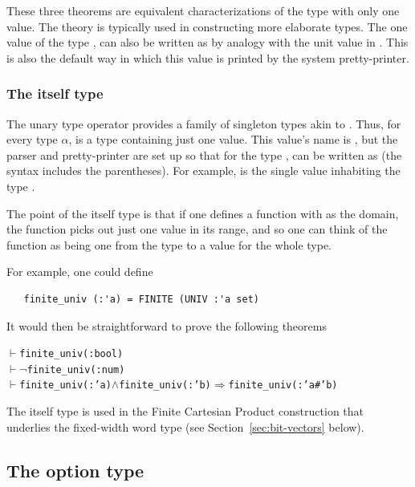 \noindent These three theorems are equivalent characterizations of the type
with only one value. The theory  is typically used in
constructing more elaborate types.  The one value of the type
, can also be written as \ml{()} by analogy with the unit
value in \ML.  This is also the default way in which this value is
printed by the system pretty-printer.

\subsubsection{The itself type}
%
The unary  type operator provides a family of singleton types akin to .
Thus, for every type $\alpha$,  is a type containing just one value.
This value's name is , but the parser and pretty-printer are set up so that for the type ,  can be written as \holtxt{(:$\alpha$)} (the syntax includes the parentheses).
For example,  is the single value inhabiting the type .

The point of the itself type is that if one defines a function with  as the domain, the function picks out just one value in its range,  and so one can think of the function as being one from the type to a value for the whole type.

For example, one could define
\begin{hol}
\begin{verbatim}
   finite_univ (:'a) = FINITE (UNIV :'a set)
\end{verbatim}
\end{hol}
It would then be straightforward to prove the following theorems
\begin{hol}
\begin{alltt}
   \(\vdash\) finite_univ(:bool)
   \(\vdash\) \(\neg\)finite_univ(:num)
   \(\vdash\) finite_univ(:'a) \(\land\) finite_univ(:'b) \(\Rightarrow\) finite_univ(:'a # 'b)
\end{alltt}
\end{hol}

The itself type is used in the Finite Cartesian Product construction that underlies the fixed-width word type (see Section~\ref{sec:bit-vectors} below).

\subsection{The option type}


